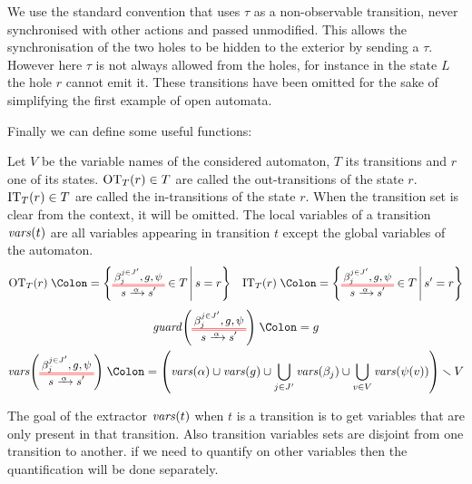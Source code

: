 \documentclass{article}
\begin{document}
\begin{exi}
We use the standard convention that uses \(\tau\) as a non-observable transition, never synchronised with other actions and passed unmodified.
This allows the synchronisation of the two holes to be hidden to the exterior by sending a \(\tau\).
However here \(\tau\) is not always allowed from the holes, for instance in the state \(L\) the hole \(r\) cannot emit it.
These transitions have been omitted for the sake of simplifying the first example of open automata.
\end{exi}
Finally we can define some useful functions:
\begin{defi}
Let \(V\) be the variable names of the considered automaton, \(T\) its transitions and \(r\) one of its states.
\(\fOT[T]{r} \in T\) are called the out-transitions of the state \(r\).
\(\fIT[T]{r} \in T\) are called the in-transitions of the state \(r\).
When the transition set is clear from the context, it will be omitted.
The local variables of a transition \(\fvars{t}\) are all variables appearing in transition \(t\) except the global variables of the automaton.
\begin{align*}
	\fOT[T]{r} & \defnotation \mset{\OTg \in T}{s = r} &
	\fIT[T]{r} & \defnotation \mset{\OTg \in T}{s' = r} \\
\end{align*}
\vspace{-1cm}
\begin{gather*}
	\fguard{\OTg} \defnotation g \\
	\fvars{\OTg} \defnotation \mpar{\fvars{\alpha} \cup \fvars{g} \cup \bigcup_{j \in J'} \fvars{\beta_j} \cup \bigcup_{v \in V} \fvars{\psi\mpar{v}}} \setminus V
\end{gather*}
\end{defi}
The goal of the extractor \(\fvars{t}\) when \(t\) is a transition is to get variables that are only present in that transition.
Also transition variables sets are disjoint from one transition to another.
if we need to quantify on other variables then the quantification will be done separately.
\end{document}
